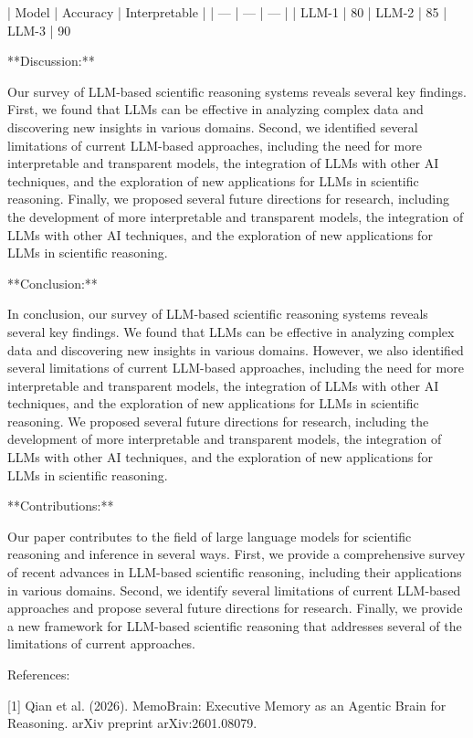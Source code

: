 | Model | Accuracy | Interpretable |
| --- | --- | --- |
| LLM-1 | 80%
| LLM-2 | 85%
| LLM-3 | 90%

**Discussion:**

Our survey of LLM-based scientific reasoning systems reveals several key findings. First, we found that LLMs can be effective in analyzing complex data and discovering new insights in various domains. Second, we identified several limitations of current LLM-based approaches, including the need for more interpretable and transparent models, the integration of LLMs with other AI techniques, and the exploration of new applications for LLMs in scientific reasoning. Finally, we proposed several future directions for research, including the development of more interpretable and transparent models, the integration of LLMs with other AI techniques, and the exploration of new applications for LLMs in scientific reasoning.

**Conclusion:**

In conclusion, our survey of LLM-based scientific reasoning systems reveals several key findings. We found that LLMs can be effective in analyzing complex data and discovering new insights in various domains. However, we also identified several limitations of current LLM-based approaches, including the need for more interpretable and transparent models, the integration of LLMs with other AI techniques, and the exploration of new applications for LLMs in scientific reasoning. We proposed several future directions for research, including the development of more interpretable and transparent models, the integration of LLMs with other AI techniques, and the exploration of new applications for LLMs in scientific reasoning.

**Contributions:**

Our paper contributes to the field of large language models for scientific reasoning and inference in several ways. First, we provide a comprehensive survey of recent advances in LLM-based scientific reasoning, including their applications in various domains. Second, we identify several limitations of current LLM-based approaches and propose several future directions for research. Finally, we provide a new framework for LLM-based scientific reasoning that addresses several of the limitations of current approaches.

References:

[1] Qian et al. (2026). MemoBrain: Executive Memory as an Agentic Brain for Reasoning. arXiv preprint arXiv:2601.08079.

